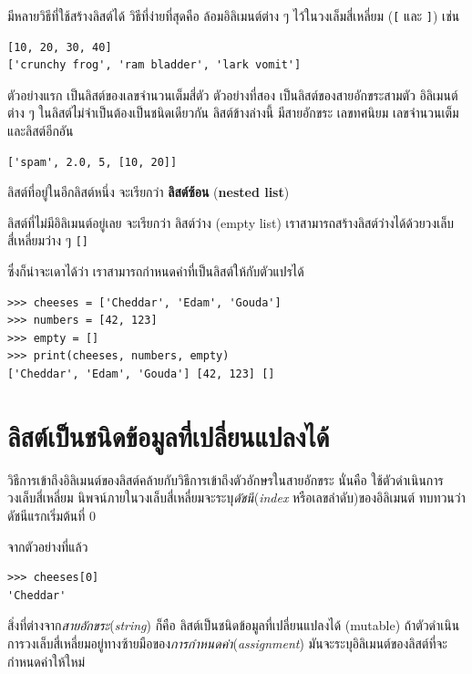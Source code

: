 มีหลายวิธีที่ใช้สร้างลิสต์ได้
วิธีที่ง่ายที่สุดคือ ล้อมอิลิเมนต์ต่าง ๆ ไว้ในวงเล็มสี่เหลี่ยม
(\verb"[" และ \verb"]") เช่น

\begin{verbatim}
[10, 20, 30, 40]
['crunchy frog', 'ram bladder', 'lark vomit']
\end{verbatim}
%
ตัวอย่างแรก เป็นลิสต์ของเลขจำนวนเต็มสี่ตัว
ตัวอย่างที่สอง เป็นลิสต์ของสายอักขระสามตัว
อิลิเมนต์ต่าง ๆ ในลิสต์ไม่จำเป็นต้องเป็นชนิดเดียวกัน
ลิสต์ข้างล่างนี้ มีสายอักขระ เลขทศนิยม เลขจำนวนเต็ม และลิสต์อีกอัน

\begin{verbatim}
['spam', 2.0, 5, [10, 20]]
\end{verbatim}
%
ลิสต์ที่อยู่ในอีกลิสต์หนึ่ง จะเรียกว่า \textbf{ลิสต์ซ้อน} (\textbf{nested list})

ลิสต์ที่ไม่มีอิลิเมนต์อยู่เลย จะเรียกว่า ลิสต์ว่าง (empty list)
เราสามารถสร้างลิสต์ว่างได้ด้วยวงเล็บสี่เหลี่ยมว่าง ๆ \verb"[]"

ซึ่งก็น่าจะเดาได้ว่า เราสามารถกำหนดค่าที่เป็นลิสต์ให้กับตัวแปรได้

\begin{verbatim}
>>> cheeses = ['Cheddar', 'Edam', 'Gouda']
>>> numbers = [42, 123]
>>> empty = []
>>> print(cheeses, numbers, empty)
['Cheddar', 'Edam', 'Gouda'] [42, 123] []
\end{verbatim}
%

\section{ลิสต์เป็นชนิดข้อมูลที่เปลี่ยนแปลงได้}
\label{mutable}

วิธีการเข้าถึงอิลิเมนต์ของลิสต์คล้ายกับวิธีการเข้าถึงตัวอักษรในสายอักขระ
นั่นคือ ใช้ตัวดำเนินการวงเล็บสี่เหลี่ยม
นิพจน์ภายในวงเล็บสี่เหลี่ยมจะระบุ\textit{ดัชนี}(\textit{index} หรือเลขลำดับ)ของอิลิเมนต์
ทบทวนว่า ดัชนีแรกเริ่มต้นที่ 0

จากตัวอย่างที่แล้ว
\begin{verbatim}
>>> cheeses[0]
'Cheddar'
\end{verbatim}
%
สิ่งที่ต่างจาก\textit{สายอักขระ}(\textit{string}) 
ก็คือ ลิสต์เป็นชนิดข้อมูลที่เปลี่ยนแปลงได้ (mutable)
ถ้าตัวดำเนินการวงเล็บสี่เหลี่ยมอยู่ทางซ้ายมือของ\textit{การกำหนดค่า}(\textit{assignment})
มันจะระบุอิลิเมนต์ของลิสต์ที่จะกำหนดค่าให้ใหม่

